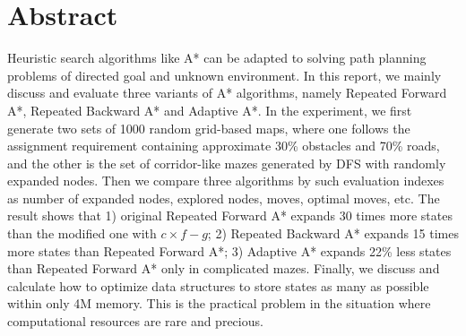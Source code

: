 \section*{Abstract}

Heuristic search algorithms like A* can be adapted to solving path planning
problems of directed goal and unknown environment. In this report, we mainly
discuss and evaluate three variants of A* algorithms, namely Repeated Forward
A*, Repeated Backward A* and Adaptive A*. In the experiment, we first generate
two sets of 1000 random grid-based maps, where one follows the assignment
requirement containing approximate 30\% obstacles and 70\% roads, and the other
is the set of corridor-like mazes generated by DFS with randomly expanded
nodes.  Then we compare three algorithms by such evaluation indexes as number
of expanded nodes, explored nodes, moves, optimal moves, etc. The result shows
that 1) original Repeated Forward A* expands 30 times more states than the
modified one with $c\times f-g$; 2) Repeated Backward A* expands 15 times more
states than Repeated Forward A*; 3) Adaptive A* expands 22\% less states than
Repeated Forward A* only in complicated mazes. Finally, we discuss and calculate
how to optimize data structures to store states as many as possible within only
4M memory.  This is the practical problem in the situation where computational
resources are rare and precious.
